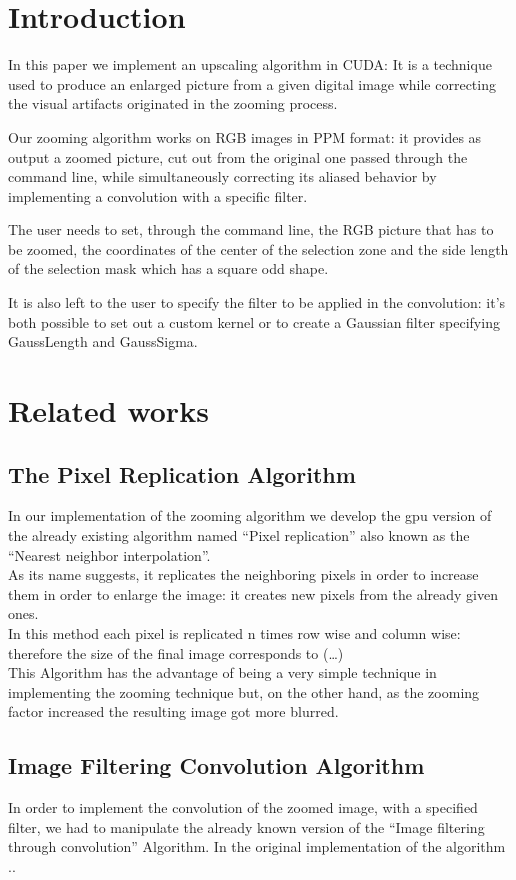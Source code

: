 \section{Introduction}

In this paper we implement an upscaling algorithm in CUDA: It is a technique used to produce an enlarged picture from a given digital image while correcting the visual artifacts originated in the zooming process.


Our zooming algorithm works on RGB images in PPM format:
it provides as output a zoomed picture, cut out from the original one passed through the command line, while simultaneously correcting its aliased behavior by implementing a convolution with a specific filter.


The user needs to set, through the command line, the RGB picture that has to be zoomed, the coordinates of the center of the selection zone and the side length of the selection mask which has a square odd shape.


It is also left to the user to specify the filter to be applied in the convolution: it's both possible to set out a custom kernel or to create a Gaussian filter specifying GaussLength and GaussSigma.

\section{Related works}

    \subsection{The Pixel Replication Algorithm}
    In our implementation of the zooming algorithm we develop the gpu version of the already existing algorithm named “Pixel replication” also known as the “Nearest neighbor interpolation”.\\
    As its name suggests, it replicates the neighboring pixels in order to increase them in order to enlarge the image: it creates new pixels from the already given ones.\\
    In this method each pixel is replicated n times row wise and column wise: therefore the size of the final image corresponds to (…) \\
    This Algorithm has the advantage of being a very simple technique in implementing the zooming technique but, on the other hand, as the zooming factor increased the resulting image got more blurred.

    \subsection{Image Filtering Convolution Algorithm}
    In order to implement the convolution of the zoomed image, with a specified filter, we had to manipulate the already known version of the “Image filtering through convolution” Algorithm.
    In the original implementation of the algorithm ..

    